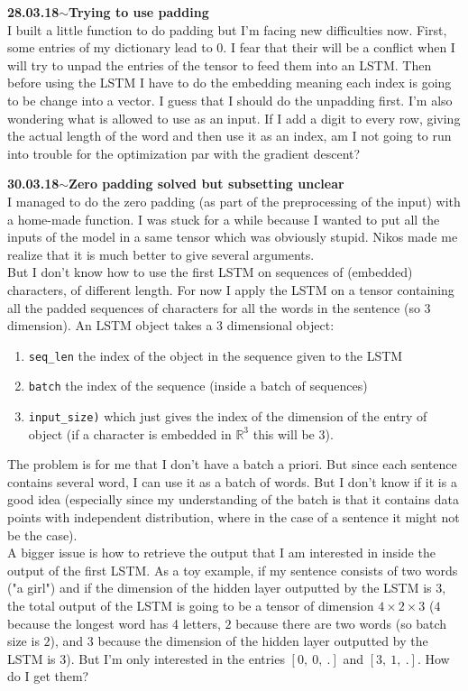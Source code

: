 \documentclass[11pt,a4paper]{article}
\newenvironment{loggentry}[2]%
{\noindent\textbf{#1}\hspace{1cm}$\mathbf{\sim}$\text{ }\textbf{#2}\\}{\vspace{0.5cm}}
\begin{document}
\begin{loggentry}{28.03.18}{Trying to use padding}
I built a little function to do padding but I'm facing new difficulties now. First, some entries of my dictionary lead to 0. I fear that their will be a conflict when I will try to unpad the entries of the tensor to feed them into an LSTM. Then before using the LSTM I have to do the embedding meaning each index is going to be change into a vector. I guess that I should do the unpadding first. I'm also wondering what is allowed to use as an input. If I add a digit to every row, giving the actual length of the word and then use it as an index, am I not going to run into trouble for the optimization par with the gradient descent?
\end{loggentry}

\begin{loggentry}{30.03.18}{Zero padding solved but subsetting unclear}
I managed to do the zero padding (as part of the preprocessing of the input) with a home-made function. I was stuck for a while because I wanted to put all the inputs of the model in a same tensor which was obviously stupid. Nikos made me realize that it is much better to give several arguments.\\
But I don't know how to use the first LSTM on sequences of (embedded) characters, of different length. For now I apply the LSTM on a tensor containing all the padded sequences of characters for all the words in the sentence (so 3 dimension). An LSTM object takes a 3 dimensional object:
\begin{enumerate}
\item \texttt{seq\_len} the index of the object in the sequence given to the LSTM
\item \texttt{batch} the index of the sequence (inside a batch of sequences)
\item \texttt{input\_size)} which just gives the index of the dimension of the entry of object (if a character is embedded in $\mathbb{R}^3$ this will be 3).
\end{enumerate}
The problem is for me that I don't have a batch a priori. But since each sentence contains several word, I can use it as a batch of words. But I don't know if it is a good idea (especially since my understanding of the batch is that it contains data points with independent distribution, where in the case of a sentence it might not be the case).\\
A bigger issue is how to retrieve the output that I am interested in inside the output of the first LSTM. As a toy example, if my sentence consists of two words ("a girl") and if the dimension of the hidden layer outputted by the LSTM is 3, the total output of the LSTM is going to be a tensor of dimension $4\times 2 \times 3$ ($4$ because the longest word has 4 letters, $2$ because there are two words (so batch size is $2$), and $3$ because the dimension of the hidden layer outputted by the LSTM is 3). But I'm only interested in the entries $[0,\ 0,\ .]$ and $[3,\ 1,\ .]$. How do I get them?\\

\end{loggentry}
\end{document}
